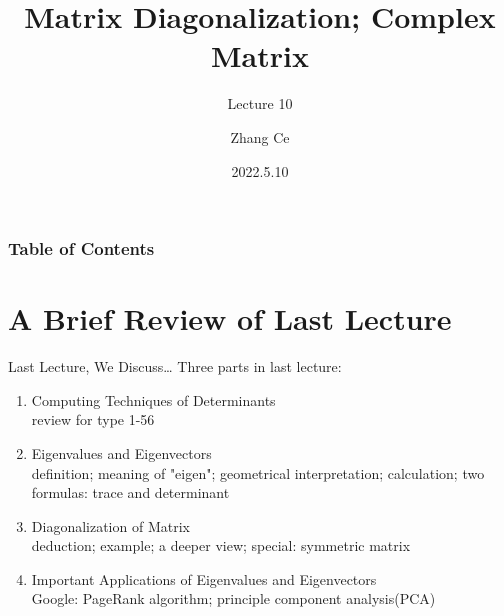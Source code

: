 \documentclass{beamer}
\title[Linear Algebra] %
{Matrix Diagonalization; Complex Matrix}
\subtitle{Lecture 10}
\author[11910803@mail.sustech.edu.cn] %
{
    Zhang Ce
}
\institute[] %
{
    Department of Electrical and Electronic Engineering\\
    Southern University of Science and Technology
}
\date[2022.5.10] %
{2022.5.10}
\begin{document}
\frame{\titlepage}


\begin{frame}
\frametitle{Table of Contents}
\tableofcontents
\end{frame}
\section{A Brief Review of Last Lecture}
\begin{frame}{Last Lecture, We Discuss\dots}
Three parts in last lecture:
    \begin{enumerate}
        \item Computing Techniques of Determinants\\
        review for type 1-56
        \item Eigenvalues and Eigenvectors\\
        definition; meaning of "eigen"; geometrical interpretation; calculation; two formulas: trace and determinant
        \item Diagonalization of Matrix\\
        deduction; example; a deeper view; special: symmetric matrix
        \item Important Applications of Eigenvalues and Eigenvectors\\
        Google: PageRank algorithm; principle component analysis(PCA)
    \end{enumerate}

\end{frame}
\end{document}
